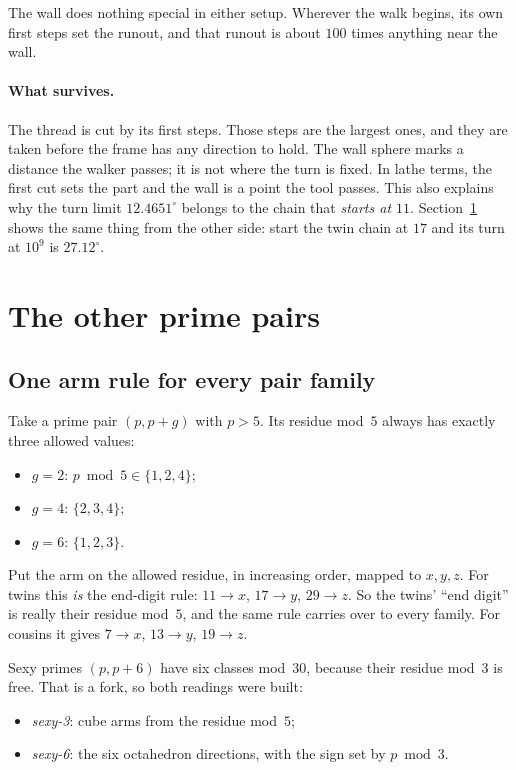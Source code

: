 The wall does nothing special in either setup. Wherever the walk begins, its own first steps set the runout, and that runout is about $100$ times anything near the wall.

\paragraph{What survives.} The thread is cut by its first steps. Those steps are the largest ones, and they are taken before the frame has any direction to hold. The wall sphere marks a distance the walker passes; it is not where the turn is fixed. In lathe terms, the first cut sets the part and the wall is a point the tool passes. This also explains why the turn limit $12.4651^\circ$ belongs to the chain that \emph{starts at $11$}. Section~\ref{sec:families} shows the same thing from the other side: start the twin chain at $17$ and its turn at $10^9$ is $27.12^\circ$.

\section{The other prime pairs}\label{sec:families}

\subsection{One arm rule for every pair family}
Take a prime pair $(p,p+g)$ with $p>5$. Its residue mod~$5$ always has exactly three allowed values:
\begin{itemize}
\item $g=2$: $p\bmod5\in\{1,2,4\}$;
\item $g=4$: $\{2,3,4\}$;
\item $g=6$: $\{1,2,3\}$.
\end{itemize}
Put the arm on the allowed residue, in increasing order, mapped to $x,y,z$. For twins this \emph{is} the end-digit rule: $11\to x$, $17\to y$, $29\to z$. So the twins' ``end digit'' is really their residue mod~$5$, and the same rule carries over to every family. For cousins it gives $7\to x$, $13\to y$, $19\to z$.

Sexy primes $(p,p+6)$ have six classes mod~$30$, because their residue mod~$3$ is free. That is a fork, so both readings were built:
\begin{itemize}
\item \emph{sexy-3}: cube arms from the residue mod~$5$;
\item \emph{sexy-6}: the six octahedron directions, with the sign set by $p\bmod3$.
\end{itemize}

